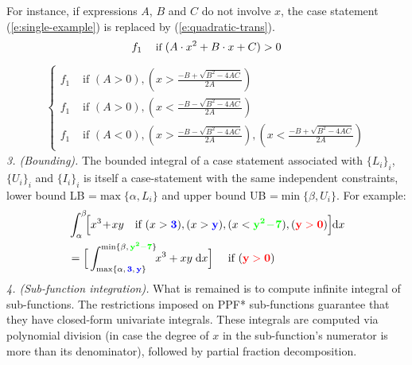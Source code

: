 \documentclass[letterpaper]{article}
\newcommand{\indicator}{\mathbb{I}}%
\newcommand{\case}[2]{#2 &\text{ if } #1}%
\newcommand{\singlecase}[2]{#2 \quad \text{ if } #1}
\newcommand{\dd}{\;\mathrm{d}} %
\begin{document}
\begin{enumerate}[leftmargin=2.6ex]
For instance, if expressions {\footnotesize$A$}, {\footnotesize$B$} and {\footnotesize$C$} do not involve $x$,
the case statement (\ref{e:single-example})
is replaced by (\ref{e:quadratic-trans}).
\begin{equation}\footnotesize
\label{e:single-example}
\singlecase{(A \cdot x^2 + B \cdot x + C)>0}{f_1}
\end{equation}
{\footnotesize
\begin{align}
\label{e:quadratic-trans}
\begin{cases}
  \case{(A\!>\!0), (x\!>\!\frac{-B + \sqrt{B^2 - 4 A C}}{2 A}) }{f_1\!} \\ 
  \case{(A\!>\!0), (x\!<\!\frac{-B - \sqrt{B^2 - 4 A C}}{2 A}) }{f_1\!} \\ 
  \case{(A\!<\!0), (x\!>\!\frac{-B - \sqrt{B^2 - 4 A C}}{2 A}),
                              (x\!<\!\frac{-B + \sqrt{B^2 - 4 A C}}{2 A})}{f_1\!}
 \end{cases}
\end{align}
}
\emph{3. (Bounding).} The bounded integral of a case statement 
associated with $\{L_i\}_i$, $\{U_i\}_i$ and $\{I_i\}_i$ 
is itself a case-statement with the same independent constraints,
 lower bound LB =$\max\{\alpha, L_i\}$ and 
 upper bound UB =$ \min\{\beta, U_i\}$.
For example:
{\footnotesize 
\begin{align*}
&\int_{\alpha}^{\beta}\!\! \Big[
\singlecase{(x>{\bf\color{blue}3}), (x>{\bf\color{blue}y}), 
(x<{\bf\color{green}y^2\!-\!7}),  ({\bf\color{red}y>0})}
{x^3\!+\!xy\!\!} \Big] \!\! \dd x \\
%
&=\singlecase{({\bf\color{red}y>0})}
{\Big[ \int_{\max\{\alpha, \,{\bf {\color{blue}3}, \, {\color{blue}y}}\}}^{\min\{\beta, \, {\bf\color{green} y^2 - 7}\}} \!\! x^3 + xy \dd x \Big]} 
\end{align*}  
}
\emph{4. (Sub-function integration).} %
What is remained is to compute infinite integral of sub-functions. 
The restrictions imposed on PPF* sub-functions 
guarantee that they have closed-form %
univariate integrals.
These integrals are computed via polynomial division 
(in case the degree of $x$ in the sub-function's numerator is more than its denominator),
followed by partial fraction decomposition.%



\end{enumerate}
\end{document}
